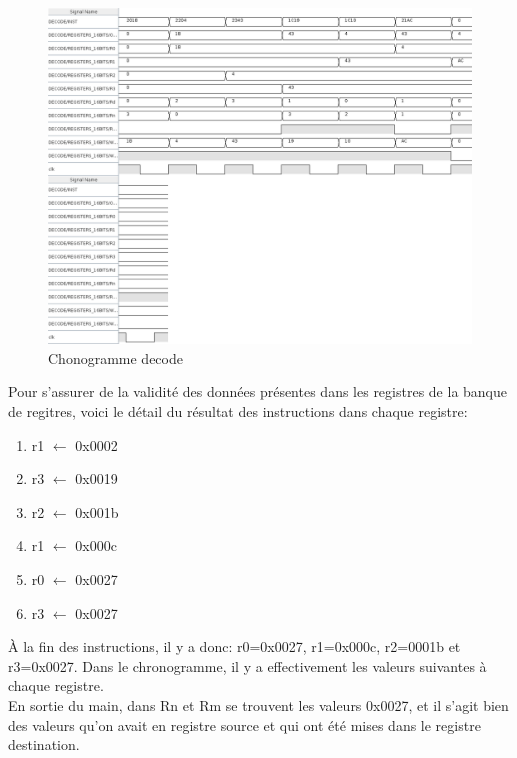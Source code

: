 \documentclass[a4paper]{article} %
\begin{document}
\begin{figure}[H]
    \centering
    \includegraphics[width=1\textwidth]{src/CHRONO_DECODE.png}
    \caption{Chonogramme decode}
    \label{chrono_decode}
\end{figure}
\pagebreak

Pour s'assurer de la validité des données présentes dans les registres de la banque de regitres, voici le détail du résultat des instructions dans chaque registre:
\begin{enumerate}
    \item r1 $\leftarrow$ 0x0002
    \item r3 $\leftarrow$ 0x0019
    \item r2 $\leftarrow$ 0x001b
    \item r1 $\leftarrow$ 0x000c
    \item r0 $\leftarrow$ 0x0027
    \item r3 $\leftarrow$ 0x0027
\end{enumerate}

À la fin des instructions, il y a donc: r0=0x0027, r1=0x000c, r2=0001b et r3=0x0027.
Dans le chronogramme, il y a effectivement les valeurs suivantes à chaque registre. \\
En sortie du main, dans Rn et Rm se trouvent les valeurs 0x0027, et il s'agit bien des valeurs qu'on avait en registre source et qui ont été mises dans le registre destination.
\end{document}
